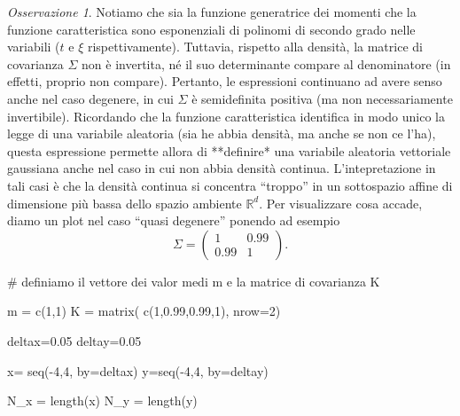 \documentclass[
  italian,
  letterpaper,
]{book}
\newenvironment{Shaded}{\begin{snugshade}}{\end{snugshade}}
\newcommand{\AttributeTok}[1]{\textcolor[rgb]{0.40,0.45,0.13}{#1}}
\newcommand{\CommentTok}[1]{\textcolor[rgb]{0.37,0.37,0.37}{#1}}
\newcommand{\DecValTok}[1]{\textcolor[rgb]{0.68,0.00,0.00}{#1}}
\newcommand{\FloatTok}[1]{\textcolor[rgb]{0.68,0.00,0.00}{#1}}
\newcommand{\FunctionTok}[1]{\textcolor[rgb]{0.28,0.35,0.67}{#1}}
\newcommand{\NormalTok}[1]{\textcolor[rgb]{0.00,0.23,0.31}{#1}}
\newcommand{\OtherTok}[1]{\textcolor[rgb]{0.00,0.23,0.31}{#1}}
\newcommand{\SpecialCharTok}[1]{\textcolor[rgb]{0.37,0.37,0.37}{#1}}
\newcommand{\bra}[1]{\left( #1 \right)}
\newcommand{\R}{\mathbb{R}}
\theoremstyle{definition}
\theoremstyle{remark}
\newtheorem*{remark}{Osservazione}
\begin{document}
\begin{remark}
Notiamo che sia la funzione generatrice dei momenti che la funzione
caratteristica sono esponenziali di polinomi di secondo grado nelle
variabili (\(t\) e \(\xi\) rispettivamente). Tuttavia, rispetto alla
densità, la matrice di covarianza \(\Sigma\) non è invertita, né il suo
determinante compare al denominatore (in effetti, proprio non compare).
Pertanto, le espressioni continuano ad avere senso anche nel caso
degenere, in cui \(\Sigma\) è semidefinita positiva (ma non
necessariamente invertibile). Ricordando che la funzione caratteristica
identifica in modo unico la legge di una variabile aleatoria (sia he
abbia densità, ma anche se non ce l'ha), questa espressione permette
allora di **definire* una variabile aleatoria vettoriale gaussiana anche
nel caso in cui non abbia densità continua. L'intepretazione in tali
casi è che la densità continua si concentra ``troppo'' in un sottospazio
affine di dimensione più bassa dello spazio ambiente \(\R^d\). Per
visualizzare cosa accade, diamo un plot nel caso ``quasi degenere''
ponendo ad esempio
\[ \Sigma = \bra{ \begin{array}{cc} 1 & 0.99 \\ 0.99 & 1\end{array}}.\]

\begin{Shaded}
\begin{Highlighting}[]
\CommentTok{\# definiamo il vettore dei valor medi m e la matrice di covarianza K}

\NormalTok{m }\OtherTok{=} \FunctionTok{c}\NormalTok{(}\DecValTok{1}\NormalTok{,}\DecValTok{1}\NormalTok{)}
\NormalTok{K }\OtherTok{=} \FunctionTok{matrix}\NormalTok{( }\FunctionTok{c}\NormalTok{(}\DecValTok{1}\NormalTok{,}\FloatTok{0.99}\NormalTok{,}\FloatTok{0.99}\NormalTok{,}\DecValTok{1}\NormalTok{), }\AttributeTok{nrow=}\DecValTok{2}\NormalTok{)}


\NormalTok{deltax}\OtherTok{=}\FloatTok{0.05}
\NormalTok{deltay}\OtherTok{=}\FloatTok{0.05}

\NormalTok{x}\OtherTok{=} \FunctionTok{seq}\NormalTok{(}\SpecialCharTok{{-}}\DecValTok{4}\NormalTok{,}\DecValTok{4}\NormalTok{, }\AttributeTok{by=}\NormalTok{deltax)}
\NormalTok{y}\OtherTok{=}\FunctionTok{seq}\NormalTok{(}\SpecialCharTok{{-}}\DecValTok{4}\NormalTok{,}\DecValTok{4}\NormalTok{, }\AttributeTok{by=}\NormalTok{deltay)}

\NormalTok{N\_x }\OtherTok{=} \FunctionTok{length}\NormalTok{(x)}
\NormalTok{N\_y }\OtherTok{=} \FunctionTok{length}\NormalTok{(y)}



\end{Highlighting}
\end{Shaded}
\end{remark}
\end{document}
